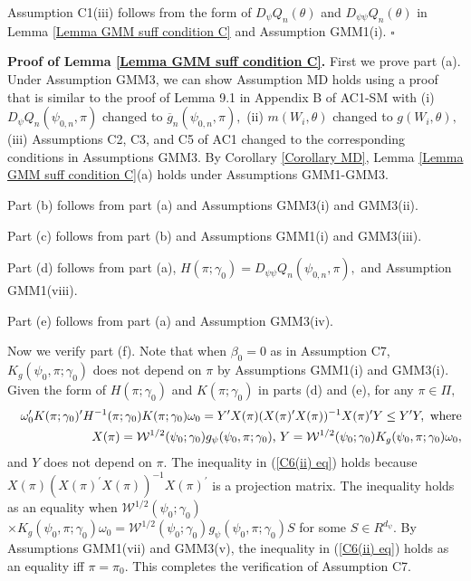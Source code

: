 \documentclass[12pt,titlepage,final,oneside,letterpaper]{article}
\begin{document}
Assumption C1(iii) follows from the form of $D_{\psi }Q_{n}(\theta )$ and $%
D_{\psi \psi }Q_{n}(\theta )$ in Lemma \ref{Lemma GMM suff condition C} and
Assumption GMM1(i). $\square $\bigskip

\noindent \textbf{Proof of Lemma \ref{Lemma GMM suff condition C}. }First we
prove part (a). Under Assumption GMM3, we can show Assumption MD holds using
a proof that is similar to the proof of Lemma 9.1 in Appendix B of AC1-SM
with (i) $D_{\psi }Q_{n}\left( \psi _{0,n},\pi \right) $ changed to $%
\overline{g}_{n}(\psi _{0,n},\pi ),$ (ii) $m\left( W_{i},\theta \right) $
changed to $g\left( W_{i},\theta \right) ,$ (iii) Assumptions C2, C3, and C5
of AC1 changed to the corresponding conditions in Assumptions GMM3. By
Corollary \ref{Corollary MD}, Lemma \ref{Lemma GMM suff condition C}(a)
holds under Assumptions GMM1-GMM3.

Part (b) follows from part (a) and Assumptions GMM3(i) and GMM3(ii).

Part (c) follows from part (b) and Assumptions GMM1(i) and GMM3(iii).

Part (d) follows from part (a), $H(\pi ;\gamma _{0})=D_{\psi \psi
}Q_{n}(\psi _{0,n},\pi ),$ and Assumption GMM1\allowbreak (viii).

Part (e) follows from part (a) and Assumption GMM3(iv).

Now we verify part (f). Note that when $\beta _{0}=0$ as in Assumption C7, $%
K_{g}(\psi _{0},\pi ;\gamma _{0})$ does not depend on $\pi $ by Assumptions
GMM1(i) and GMM3(i). Given the form of $H(\pi ;\gamma _{0})$ and $K(\pi
;\gamma _{0})$ in parts (d) and (e), for any $\pi \in \Pi ,$%
\begin{eqnarray}
&&\omega _{0}^{\prime }K(\pi ;\gamma _{0})^{\prime }H^{-1}(\pi ;\gamma
_{0})K(\pi ;\gamma _{0})\omega _{0}\overset{}{=}Y^{\prime }X(\pi )(X(\pi
)^{\prime }X(\pi ))^{-1}X(\pi )^{\prime }Y\overset{}{\leq }Y^{\prime }Y,%
\text{ where}  \notag \\
&&X(\pi )\overset{}{=}\mathcal{W}^{1/2}(\psi _{0};\gamma _{0})g_{\psi }(\psi
_{0},\pi ;\gamma _{0})\text{, }Y\overset{}{=}\mathcal{W}^{1/2}(\psi
_{0};\gamma _{0})K_{g}(\psi _{0},\pi ;\gamma _{0})\omega _{0},
\label{C6(ii) eq}
\end{eqnarray}%
and $Y$ does not depend on $\pi .$ The inequality in (\ref{C6(ii) eq}) holds
because $X(\pi )(X(\pi )^{\prime }X(\pi ))^{-1}\allowbreak X(\pi )^{\prime }$
is a projection matrix. The inequality holds as an equality when $\mathcal{W}%
^{1/2}(\psi _{0};\gamma _{0})$\linebreak $\times K_{g}(\psi _{0},\pi ;\gamma
_{0})\omega _{0}=\mathcal{W}^{1/2}(\psi _{0};\gamma _{0})g_{\psi }(\psi
_{0},\pi ;\gamma _{0})S$ for some $S\in R^{d_{\psi }}.$ By Assumptions
GMM1(vii) and GMM3(v), the inequality in (\ref{C6(ii) eq}) holds as an
equality iff $\pi =\pi _{0}.$ This completes the verification of Assumption
C7.
\end{document}
